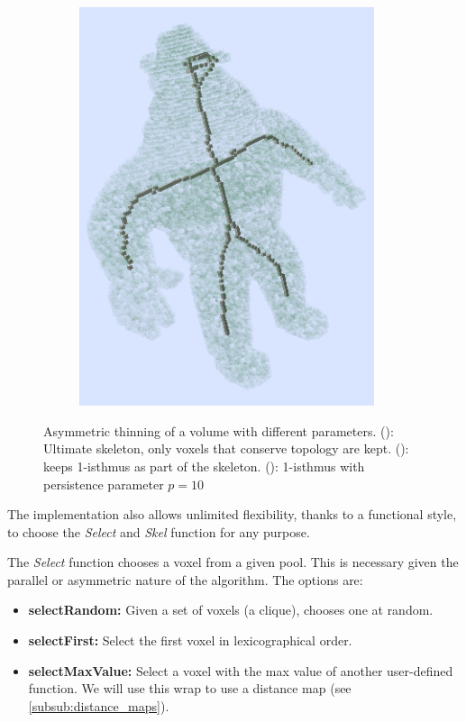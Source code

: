 \begin{figure}[!htb]
\begin{subfigure}{0.333\textwidth}
    \includegraphics[width=0.95\textwidth]{Figures/chapter-image/dgtal/voxelComplexAl1IsthtmusP10.png}%
    \caption{}
    \label{subfig:thin_al_p10}
  \end{subfigure}
  \caption{Asymmetric thinning of a volume with different parameters. (): Ultimate skeleton, only voxels that conserve topology are kept. (): keeps 1-isthmus as part of the skeleton. (): 1-isthmus with persistence parameter $p = 10$}
  \label{fig:thin_al}
\end{figure}

The implementation also allows unlimited flexibility, thanks to a functional style, to choose the \textit{Select} and \textit{Skel} function for any purpose.

The \textit{Select} function chooses a voxel from a given pool. This is necessary given the parallel or asymmetric nature of the algorithm. The options are:

\begin{itemize}[topsep=0pt]
  \item \textbf{selectRandom: } Given a set of voxels (a clique), chooses one at random.
  \item \textbf{selectFirst: } Select the first voxel in lexicographical order.
  \item \textbf{selectMaxValue: } Select a voxel with the max value of another user-defined function. We will use this wrap to use a distance map (see \autoref{subsub:distance_maps}).
\end{itemize}

